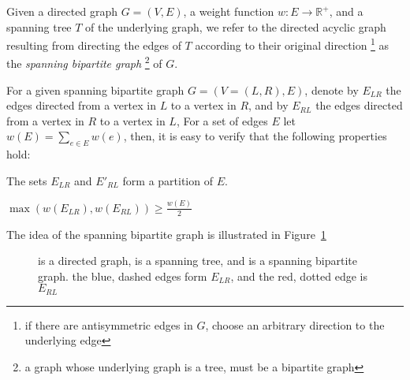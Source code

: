 Given a directed graph $G = (V, E)$,
a weight function $w : E \rightarrow \mathbb{R^+}$, 
and a spanning tree $T$ of the underlying graph, 
we refer to the directed acyclic graph resulting from directing the edges 
of $T$ according to their original direction
\footnote{if there are antisymmetric edges in $G$, 
choose an arbitrary direction to the underlying edge}
as the \emph{spanning bipartite graph}
\footnote{a graph whose underlying graph is a tree, must be a bipartite graph}
of $G$.

For a given spanning bipartite graph $G = (V = (L, R), E)$, 
denote by $E_{LR}$ the edges directed from a vertex in $L$ to a vertex in $R$,
and by $E_{RL}$ the edges directed from a vertex in $R$ to a vertex in $L$,
For a set of edges $E$ let $w(E) = \sum_{e \in E}{w(e)}$, 
then, it is easy to verify that the following properties hold:

\begin{observation}
The sets $E_{LR}$ and $E'_{RL}$ form a partition of $E$. 
\end{observation}

\begin{observation}
\label{ob:geq_half}
$ \max(w(E_{LR}), w(E_{RL}))  \geq \frac{w(E)}{2} $
\end{observation}

The idea of the spanning bipartite graph is illustrated in 
Figure~\ref{fig:spanning-bipartite-graph}

\begin{figure}
\centering

\caption{
\label{fig:spanning-bipartite-graph}
 is a directed graph, 
 is a spanning tree, and  
 is a spanning bipartite graph.
the blue, dashed edges form $E_{LR}$, 
and the red, dotted edge is $E_{RL}$  
}
\end{figure}